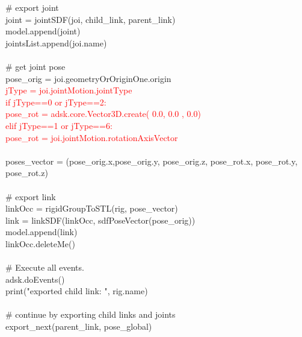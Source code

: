{\hphantom{\quad\quad\quad\quad\quad\quad\quad}\# export joint\\
\hphantom{\quad\quad\quad\quad\quad\quad\quad}joint = jointSDF(joi, child\_link, parent\_link)\\
\hphantom{\quad\quad\quad\quad\quad\quad\quad}model.append(joint)\\
\hphantom{\quad\quad\quad\quad\quad\quad\quad}jointsList.append(joi.name)\\
\\
\hphantom{\quad\quad\quad\quad\quad\quad\quad}\# get joint pose\\
\hphantom{\quad\quad\quad\quad\quad\quad\quad}pose\_orig = joi.geometryOrOriginOne.origin\\
\hphantom{\quad\quad\quad\quad\quad\quad\quad}\textcolor{red}{jType = joi.jointMotion.jointType\\
\hphantom{\quad\quad\quad\quad\quad\quad\quad}if jType==0 or jType==2:\\
\hphantom{\quad\quad\quad\quad\quad\quad\quad\quad}pose\_rot = adsk.core.Vector3D.create( 0.0, 0.0 , 0.0)\\
\hphantom{\quad\quad\quad\quad\quad\quad\quad}elif jType==1 or jType==6: \\
\hphantom{\quad\quad\quad\quad\quad\quad\quad\quad}pose\_rot = joi.jointMotion.rotationAxisVector}\\
\\
\hphantom{\quad\quad\quad\quad\quad\quad\quad}poses\_vector = (pose\_orig.x,pose\_orig.y, pose\_orig.z, pose\_rot.x, pose\_rot.y, pose\_rot.z)\\
\\
\hphantom{\quad\quad\quad\quad\quad\quad\quad}\# export link\\
\hphantom{\quad\quad\quad\quad\quad\quad\quad}linkOcc = rigidGroupToSTL(rig, pose\_vector)\\
\hphantom{\quad\quad\quad\quad\quad\quad\quad}link = linkSDF(linkOcc, sdfPoseVector(pose\_orig))\\
\hphantom{\quad\quad\quad\quad\quad\quad\quad}model.append(link)\\
\hphantom{\quad\quad\quad\quad\quad\quad\quad}linkOcc.deleteMe()\\
\\
\hphantom{\quad\quad\quad\quad\quad\quad\quad}\# Execute all events.\\
\hphantom{\quad\quad\quad\quad\quad\quad\quad}adsk.doEvents()\\
\hphantom{\quad\quad\quad\quad\quad\quad\quad}print("exported child link: ", rig.name)\\
\\
\hphantom{\quad\quad\quad\quad\quad\quad\quad}\# continue by exporting child links and joints\\
\hphantom{\quad\quad\quad\quad\quad\quad\quad}export\_next(parent\_link, pose\_global)\\
}

